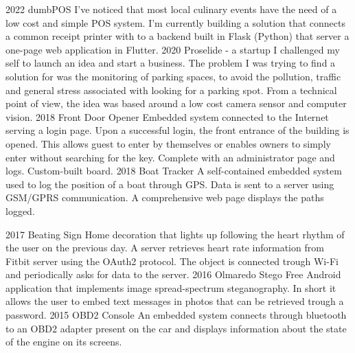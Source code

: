 \documentclass[]{friggeri-cv}
\begin{document}
\begin{entrylist}
  \entry
	{2022}
	{dumbPOS}
	{}
	{I've noticed that most local culinary events have the need of a low cost and simple POS system. I'm currently building a solution that connects a common receipt printer with to a backend built in Flask (Python) that server a one-page web application in Flutter. }
	\entry
	{2020}
	{Proselide - a startup}
	{}
	{I challenged my self to launch an idea and start a business. The problem I was trying to find a solution for was the monitoring of parking spaces, to avoid the pollution, traffic and general stress associated with looking for a parking spot. From a technical point of view, the idea was based around a low cost camera sensor and computer vision.}
	\entry
	{2018}
	{Front Door Opener}
	{}
	{Embedded system connected to the Internet serving a login page. Upon a successful login, the front entrance of the building is opened. This allows guest to enter by themselves or enables owners to simply enter without searching  for the key. Complete with an administrator page and logs. Custom-built board.}
    \entry
    {2018}
    {Boat Tracker}
    {}
    {A self-contained embedded system used to log the position of a boat through GPS. Data is sent to a server using GSM/GPRS communication. A comprehensive web page displays the paths logged.}
\end{entrylist}
\begin{entrylist}
	\entry	
	{2017}
	{Beating Sign}
	{}
	{Home decoration that lights up following the heart rhythm of the user on the previous day. A server retrieves heart rate information from Fitbit server using the OAuth2 protocol. The object is connected trough Wi-Fi and periodically asks for data to the server.}	
	\entry
	{2016}
	{Olmaredo Stego}
	{}
	{Free Android application that implements image spread-spectrum steganography. In short it allows the user to embed text messages in photos that can be retrieved trough a password.}
	\entry
	{2015}
	{OBD2 Console}
	{}
	{An embedded system connects through bluetooth to an OBD2 adapter present on the car and displays information about the state of the engine on its screens.}	
\end{entrylist}
	
\end{document}
